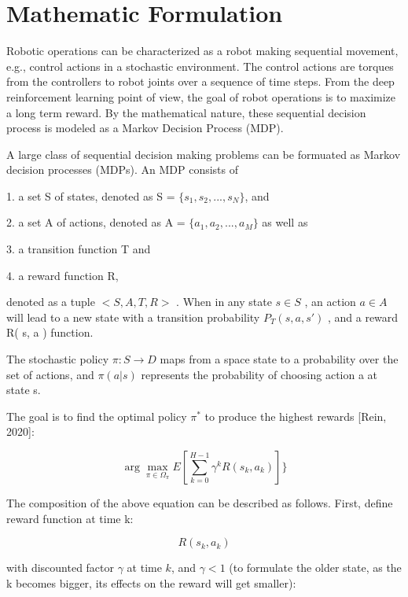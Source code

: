 \documentclass[conference]{IEEEtran}
\begin{document}
\section{Mathematic Formulation}

Robotic operations can be characterized as a robot making
sequential movement, e.g., control actions in a stochastic 
environment. The control actions are torques from the
controllers to robot joints over a sequence of time steps. 
From the deep reinforcement learning point of view, the 
goal of robot operations is to maximize 
a long term reward. By the mathematical nature, these
sequential decision process is modeled as 
a Markov Decision Process (MDP). 

A large class of sequential decision 
making problems can be formuated as 
Markov decision processes (MDPs). 
An MDP consists of 

1. a set S of states, denoted as 
S = $\{s_1, s_2, ..., s_N \}$, 
and 

2. a set A of actions, denoted as 
A = $\{a_1, a_2, ..., a_M \}$ 
as well as 

3. a transition function
T and 

4. a reward function R, 

denoted as 
a tuple $< S, A, T, R >$ .
When in any state $s \in S$ , an action $a \in A$ 
will lead to a new state with a transition 
probability $P_T ( s, a, s\prime )$ , and 
a reward R( s, a ) function. 

The stochastic policy $\pi  : S \rightarrow D$ maps from a 
space state to a probability over the set of actions, 
and $\pi  ( a | s )$ represents the probability
of choosing action a at state s. 

The goal is to find the optimal policy
$\pi^*$ to produce the highest rewards  [Rein, 2020]:

\begin{equation} 
\arg\max_{\pi \in {\Omega}_{\pi}} 
E [\sum_{k=0}^{H-1} {\gamma}^k R (s_k, a_k) ] 
\} 
\end{equation}

The composition of the above equation can be 
described as follows. 
First, define reward function at time k: 

\begin{equation} 
R (s_k, a_k) 
\end{equation}

with discounted factor $\gamma$ at time $k$, and 
$\gamma < 1$ (to formulate the older state, as the k 
becomes bigger, its effects on the reward will get 
smaller): 
\end{document}
